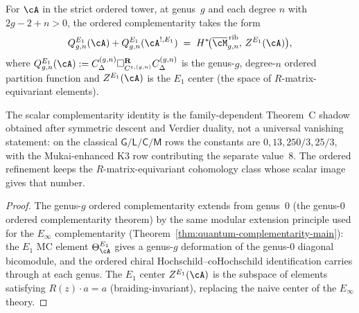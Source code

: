 \begin{theorem}
\label{thm:e1-theorem-C-modular}
For $\cA$ in the strict ordered tower, at genus~$g$ and each degree
$n$ with $2g - 2 + n > 0$, the ordered
complementarity takes the form
\begin{equation}
\label{eq:e1-complementarity-modular}
Q_{g,n}^{E_1}(\cA) + Q_{g,n}^{E_1}(\cA^{!,E_1})
\;=\;
H^*\!\bigl(\overline{\cM}_{g,n}^{\,\mathrm{rib}},\,
Z^{E_1}(\cA)\bigr),
\end{equation}
where $Q_{g,n}^{E_1}(\cA) :=
C_\Delta^{(g,n)} \square_{C^{e,(g,n)}}^{\mathbf{R}} C_\Delta^{(g,n)}$
is the genus-$g$, degree-$n$ ordered partition function and
$Z^{E_1}(\cA)$ is the $E_1$ center \textup{(}the space of
$R$-matrix-equivariant elements\textup{)}.

The scalar complementarity identity is the family-dependent
Theorem~C shadow obtained after symmetric descent and Verdier duality,
not a universal vanishing statement: on the classical
$\mathsf{G}/\mathsf{L}/\mathsf{C}/\mathsf{M}$ rows the constants are
$0,13,250/3,25/3$, with the Mukai-enhanced K3 row contributing the
separate value~$8$. The ordered refinement keeps the
$R$-matrix-equivariant cohomology class whose scalar image gives that
number.
\end{theorem}

\begin{proof}
The genus-$g$ ordered complementarity extends from genus~$0$
(the genus-$0$ ordered complementarity theorem) by the same modular extension
principle used for the $E_\infty$ complementarity
(Theorem~\ref{thm:quantum-complementarity-main}): the
$E_1$ MC element $\Theta^{E_1}_\cA$ gives a genus-$g$
deformation of the genus-$0$ diagonal bicomodule, and the
ordered chiral Hochschild--coHochschild identification carries through
at each genus. The $E_1$ center $Z^{E_1}(\cA)$ is the subspace
of elements satisfying $R(z) \cdot a = a$ (braiding-invariant),
replacing the naive center of the $E_\infty$ theory.
\end{proof}

